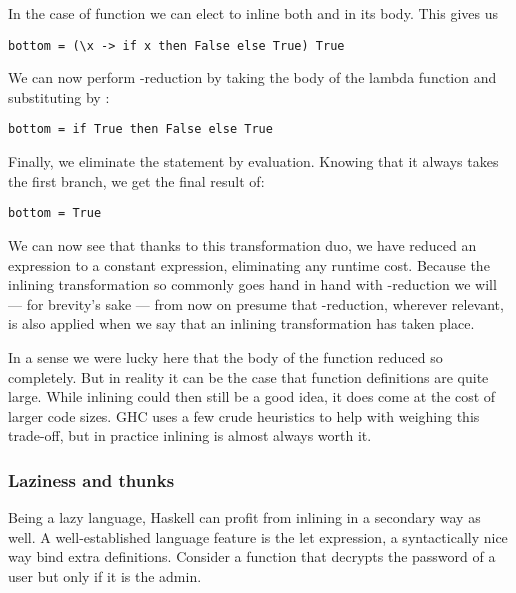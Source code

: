 In the case of  function we can elect to inline both  and 
in its body. This gives us 

\begin{listing}[H]
\begin{verbatim}
bottom = (\x -> if x then False else True) True
\end{verbatim}
\end{listing}

We can now perform \textbeta-reduction by taking the body of the lambda function
and substituting  by :

\begin{listing}[H]
\begin{verbatim}
bottom = if True then False else True
\end{verbatim}
\end{listing}

Finally, we eliminate the  statement by evaluation. Knowing that it always takes the first branch, we
get the final result of:

\begin{listing}[H]
\begin{verbatim}
bottom = True
\end{verbatim}
\end{listing}

We can now see that thanks to this transformation duo, we have reduced an expression to a constant
expression, eliminating any runtime cost. Because the inlining transformation so commonly goes hand
in hand with \textbeta-reduction we will --- for brevity's sake --- from now on presume that \textbeta-reduction,
wherever relevant, is also applied when we say that an inlining transformation has taken place.

In a sense we were lucky here that the body of the  function reduced so completely. But in reality
it can be the case that function definitions are quite large. While inlining could then still be a good idea,
it does come at the cost of larger code sizes. GHC uses a few crude heuristics to help with weighing this trade-off, but
in practice inlining is almost always worth it. \cite{haskell_optimisations_1997}


\subsubsection{Laziness and thunks}
Being a lazy language, Haskell can profit from inlining in a secondary way as well. A well-established
language feature is the let expression, a syntactically nice way bind extra definitions. Consider a function
that decrypts the password of a user but only if it is the admin.


